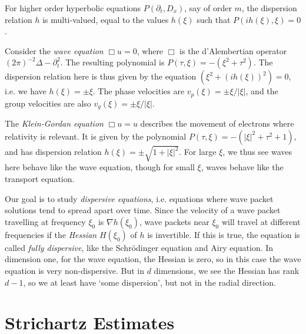 For higher order hyperbolic equations $P(\partial_t, D_x)$, say of order $m$, the dispersion relation $h$ is multi-valued, equal to the values $h(\xi)$ such that $P(i h(\xi),\xi) = 0$.

\begin{example}
	Consider the \emph{wave equation} $\Box u = 0$, where $\Box$ is the d'Alembertian operator $(2 \pi)^{-2} \Delta - \partial_t^2$. The resulting polynomial is $P(\tau,\xi) = -(\xi^2 + \tau^2)$. The dispersion relation here is thus given by the equation $(\xi^2 + (i h(\xi))^2) = 0$, i.e. we have $h(\xi) = \pm \xi$. The phase velocities are $v_p(\xi) = \pm \xi / |\xi|$, and the group velocities are also $v_g(\xi) = \pm \xi / |\xi|$.
\end{example}

\begin{example}
	The \emph{Klein-Gordan equation} $\Box u = u$ describes the movement of electrons where relativity is relevant. It is given by the polynomial $P(\tau,\xi) = - (|\xi|^2 + \tau^2 + 1)$, and has dispersion relation $h(\xi) = \pm \sqrt{1 + |\xi|^2}$. For large $\xi$, we thus see waves here behave like the wave equation, though for small $\xi$, waves behave like the transport equation.
\end{example}

Our goal is to study \emph{dispersive equations}, i.e. equations where wave packet solutions tend to spread apart over time. Since the velocity of a wave packet travelling at frequency $\xi_0$ is $\nabla h(\xi_0)$, wave packets near $\xi_0$ will travel at different frequencies if the \emph{Hessian} $H(\xi_0)$ of $h$ is invertible. If this is true, the equation is called \emph{fully dispersive}, like the Schr\"{o}dinger equation and Airy equation. In dimension one, for the wave equation, the Hessian is zero, so in this case the wave equation is very non-dispersive. But in $d$ dimensions, we see the Hessian has rank $d-1$, so we at least have `some dispersion', but not in the radial direction.








\section{Strichartz Estimates}

